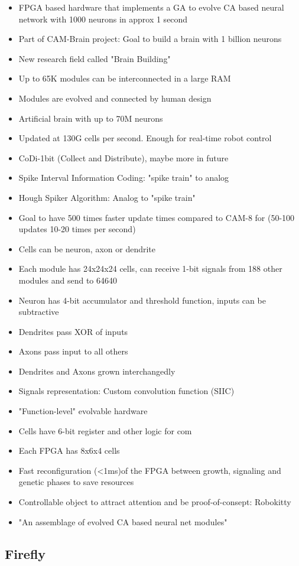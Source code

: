 \begin{itemize}
    \item FPGA based hardware that implements a GA to evolve CA based neural network with 1000 neurons in approx 1 second
    \item Part of CAM-Brain project: Goal to build a brain with 1 billion neurons
    \item New research field called "Brain Building"
    \item Up to 65K modules can be interconnected in a large RAM
    \item Modules are evolved and connected by human design
    \item Artificial brain with up to 70M neurons
    \item Updated at 130G cells per second. Enough for real-time robot control
    \item CoDi-1bit (Collect and Distribute), maybe more in future
    \item Spike Interval Information Coding: "spike train" to analog
    \item Hough Spiker Algorithm: Analog to "spike train"
    \item Goal to have 500 times faster update times compared to CAM-8 for (50-100 updates 10-20 times per second)
    \item Cells can be neuron, axon or dendrite
    \item Each module has 24x24x24 cells, can receive 1-bit signals from 188 other modules and send to 64640
    \item Neuron has 4-bit accumulator and threshold function, inputs can be subtractive
    \item Dendrites pass XOR of inputs
    \item Axons pass input to all others
    \item Dendrites and Axons grown interchangedly
    \item Signals representation: Custom convolution function (SIIC)
    \item "Function-level" evolvable hardware
    \item Cells have 6-bit register and other logic for com
    \item Each FPGA has 8x6x4 cells
    \item Fast reconfiguration (<1ms)of the FPGA between growth, signaling and genetic phases to save resources
    \item Controllable object to attract attention and be proof-of-consept: Robokitty
    \item "An assemblage of evolved CA based neural net modules"
\end{itemize}

\subsection{Firefly}

\TODO
